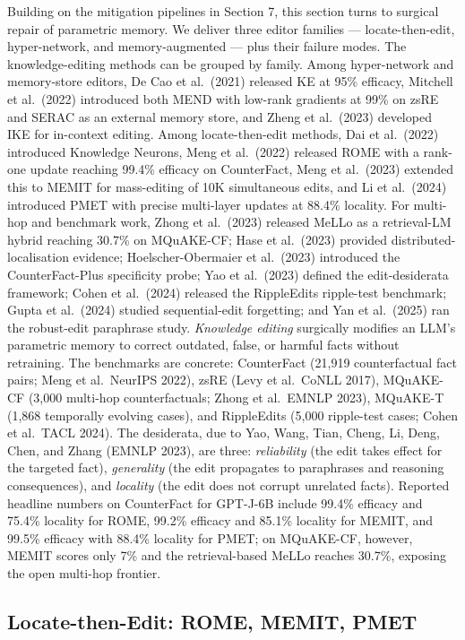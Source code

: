 Building on the mitigation pipelines in Section 7, this section turns to surgical repair of parametric memory. We deliver three editor families --- locate-then-edit, hyper-network, and memory-augmented --- plus their failure modes. The knowledge-editing methods can be grouped by family. Among hyper-network and memory-store editors, De Cao et al.~(2021) released KE at 95\% efficacy, Mitchell et al.~(2022) introduced both MEND with low-rank gradients at 99\% on zsRE and SERAC as an external memory store, and Zheng et al.~(2023) developed IKE for in-context editing. Among locate-then-edit methods, Dai et al.~(2022) introduced Knowledge Neurons, Meng et al.~(2022) released ROME with a rank-one update reaching 99.4\% efficacy on CounterFact, Meng et al.~(2023) extended this to MEMIT for mass-editing of 10K simultaneous edits, and Li et al.~(2024) introduced PMET with precise multi-layer updates at 88.4\% locality. For multi-hop and benchmark work, Zhong et al.~(2023) released MeLLo as a retrieval-LM hybrid reaching 30.7\% on MQuAKE-CF; Hase et al.~(2023) provided distributed-localisation evidence; Hoelscher-Obermaier et al.~(2023) introduced the CounterFact-Plus specificity probe; Yao et al.~(2023) defined the edit-desiderata framework; Cohen et al.~(2024) released the RippleEdits ripple-test benchmark; Gupta et al.~(2024) studied sequential-edit forgetting; and Yan et al.~(2025) ran the robust-edit paraphrase study. \emph{Knowledge editing} surgically modifies an LLM's parametric memory to correct outdated, false, or harmful facts without retraining. The benchmarks are concrete: CounterFact (21,919 counterfactual fact pairs; Meng et al.~NeurIPS 2022), zsRE (Levy et al.~CoNLL 2017), MQuAKE-CF (3,000 multi-hop counterfactuals; Zhong et al.~EMNLP 2023), MQuAKE-T (1,868 temporally evolving cases), and RippleEdits (5,000 ripple-test cases; Cohen et al.~TACL 2024). The desiderata, due to Yao, Wang, Tian, Cheng, Li, Deng, Chen, and Zhang (EMNLP 2023), are three: \emph{reliability} (the edit takes effect for the targeted fact), \emph{generality} (the edit propagates to paraphrases and reasoning consequences), and \emph{locality} (the edit does not corrupt unrelated facts). Reported headline numbers on CounterFact for GPT-J-6B include 99.4\% efficacy and 75.4\% locality for ROME, 99.2\% efficacy and 85.1\% locality for MEMIT, and 99.5\% efficacy with 88.4\% locality for PMET; on MQuAKE-CF, however, MEMIT scores only 7\% and the retrieval-based MeLLo reaches 30.7\%, exposing the open multi-hop frontier.

\subsection{Locate-then-Edit: ROME, MEMIT, PMET}\label{locate-then-edit-rome-memit-pmet}

